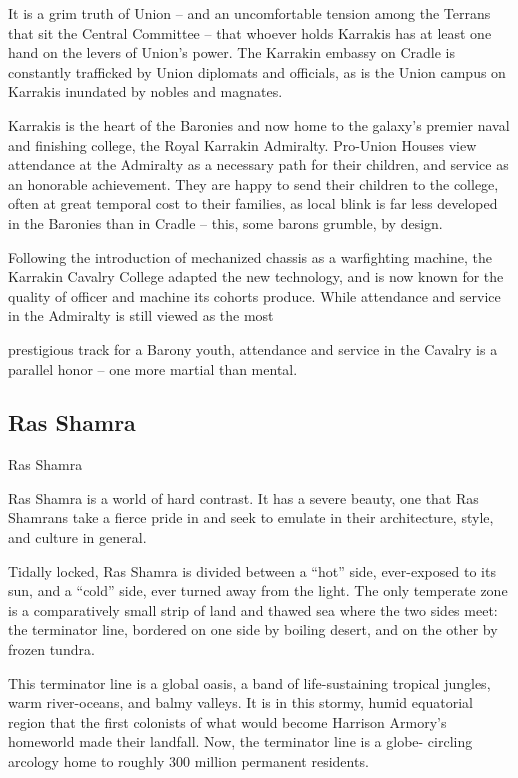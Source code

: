 It is a grim truth of Union -- and an uncomfortable tension among the Terrans that sit the Central  
Committee -- that whoever holds Karrakis has at least one hand on the levers of Union’s power.  
The Karrakin embassy on Cradle is constantly trafficked by Union diplomats and officials, as is the  
Union campus on Karrakis inundated by nobles and magnates.   

Karrakis is the heart of the Baronies and now home to the galaxy’s premier naval and finishing  
college, the Royal Karrakin Admiralty. Pro-Union Houses view attendance at the Admiralty as a  
necessary path for their children, and service as an honorable achievement. They are happy to  
send their children to the college, often at great temporal cost to their families, as local blink is far  
less developed in the Baronies than in Cradle -- this, some barons grumble, by design.   

Following the introduction of mechanized chassis as a warfighting machine, the Karrakin Cavalry  
College adapted the new technology, and is now known for the quality of officer and machine its  
cohorts produce. While attendance and service in the Admiralty is still viewed as the most  

                                                                                                           


prestigious track for a Barony youth, attendance and service in the Cavalry is a parallel honor --  
one more martial than mental.   
\subsection{Ras Shamra}
Ras Shamra  

Ras Shamra is a world of hard contrast. It has a severe beauty, one that Ras Shamrans take a  
fierce pride in and seek to emulate in their architecture, style, and culture in general.   

Tidally locked, Ras Shamra is divided between a “hot” side, ever-exposed to its sun, and a “cold”  
side, ever turned away from the light. The only temperate zone is a comparatively small strip of  
land and thawed sea where the two sides meet: the terminator line, bordered on one side by  
boiling desert, and on the other by frozen tundra.   

This terminator line is a global oasis, a band of life-sustaining tropical jungles, warm river-oceans,  
and balmy valleys. It is in this stormy, humid equatorial region that the first colonists of what would  
become Harrison Armory’s homeworld made their landfall. Now, the terminator line is a globe- 
circling arcology home to roughly 300 million permanent residents.   

